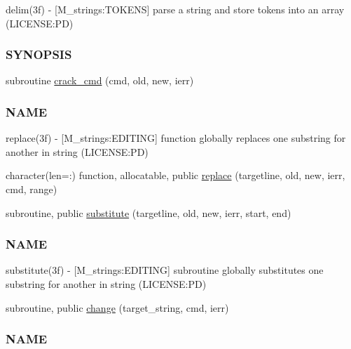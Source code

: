 \begin{DoxyCompactItemize}
\begin{DoxyCompactList}
delim(3f) -\/ \mbox{[}M\+\_\+strings\+:T\+O\+K\+E\+NS\mbox{]} parse a string and store tokens into an array (L\+I\+C\+E\+N\+SE\+:PD) \subsubsection*{S\+Y\+N\+O\+P\+S\+IS}\end{DoxyCompactList}\item 
subroutine \mbox{\hyperlink{namespacem__strings_a818d715927dd61c1be6df5d2cdec4e4c}{crack\+\_\+cmd}} (cmd, old, new, ierr)
\begin{DoxyCompactList}\small\item\em \subsubsection*{N\+A\+ME}

replace(3f) -\/ \mbox{[}M\+\_\+strings\+:E\+D\+I\+T\+I\+NG\mbox{]} function globally replaces one substring for another in string (L\+I\+C\+E\+N\+SE\+:PD) \end{DoxyCompactList}\item 
character(len=\+:) function, allocatable, public \mbox{\hyperlink{namespacem__strings_ab5af73797bb08e7f654d39c9e8984ffe}{replace}} (targetline, old, new, ierr, cmd, range)
\item 
subroutine, public \mbox{\hyperlink{namespacem__strings_ab84a4b7c2be211433c2d1b435a87fa32}{substitute}} (targetline, old, new, ierr, start, end)
\begin{DoxyCompactList}\small\item\em \subsubsection*{N\+A\+ME}

substitute(3f) -\/ \mbox{[}M\+\_\+strings\+:E\+D\+I\+T\+I\+NG\mbox{]} subroutine globally substitutes one substring for another in string (L\+I\+C\+E\+N\+SE\+:PD) \end{DoxyCompactList}\item 
subroutine, public \mbox{\hyperlink{namespacem__strings_a1222f3b718f7637105bde330367925e1}{change}} (target\+\_\+string, cmd, ierr)
\begin{DoxyCompactList}\small\item\em \subsubsection*{N\+A\+ME}


\end{DoxyCompactList}
\end{DoxyCompactItemize}
